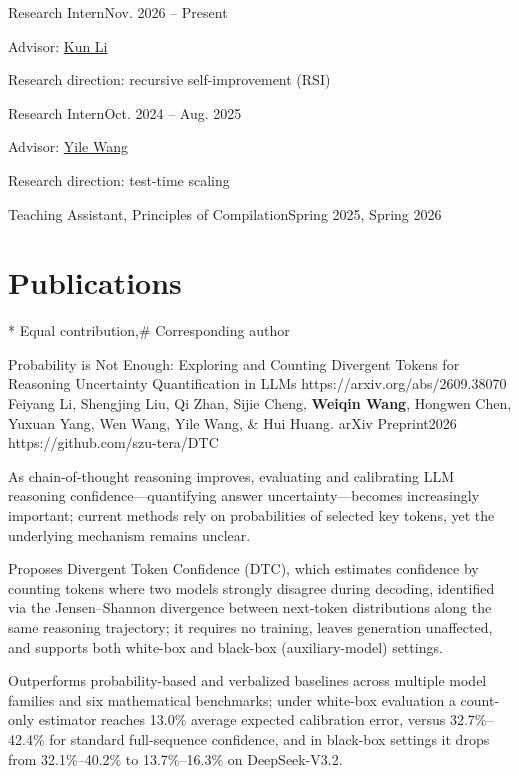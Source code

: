   {Research Intern}{Nov. 2026 -- Present}
\begin{cvitems}
  \item Advisor: \href{https://drugd.github.io/KunLiCV.github.io/}{Kun Li}
  \item Research direction: recursive self-improvement (RSI)
\end{cvitems}

  {Research Intern}{Oct. 2024 -- Aug. 2025}
\begin{cvitems}
  \item Advisor: \href{https://ylwangy.github.io/}{Yile Wang}
  \item Research direction: test-time scaling
\end{cvitems}

  {Teaching Assistant, Principles of Compilation}{Spring 2025, Spring 2026}


\section{Publications}
{\footnotesize\color{muted}* Equal contribution,\enspace \# Corresponding author\par}
\vspace{-0.6ex}

\pub
  {Probability is Not Enough: Exploring and Counting Divergent Tokens for Reasoning Uncertainty Quantification in LLMs}
  {https://arxiv.org/abs/2609.38070}
  {Feiyang Li, Shengjing Liu, Qi Zhan, Sijie Cheng, \textbf{Weiqin Wang}, Hongwen Chen, Yuxuan Yang, Wen Wang, Yile Wang, \& Hui Huang.}
  {arXiv Preprint}{2026}
  {https://github.com/szu-tera/DTC}
\begin{pubnotes}
  \item {}As chain-of-thought reasoning improves, evaluating and calibrating LLM reasoning confidence---quantifying answer uncertainty---becomes increasingly important; current methods rely on probabilities of selected key tokens, yet the underlying mechanism remains unclear.
  \item {}Proposes Divergent Token Confidence (DTC), which estimates confidence by counting tokens where two models strongly disagree during decoding, identified via the Jensen--Shannon divergence between next-token distributions along the same reasoning trajectory; it requires no training, leaves generation unaffected, and supports both white-box and black-box (auxiliary-model) settings.
  \item {}Outperforms probability-based and verbalized baselines across multiple model families and six mathematical benchmarks; under white-box evaluation a count-only estimator reaches 13.0\% average expected calibration error, versus 32.7\%--42.4\% for standard full-sequence confidence, and in black-box settings it drops from 32.1\%--40.2\% to 13.7\%--16.3\% on DeepSeek-V3.2.
\end{pubnotes}

